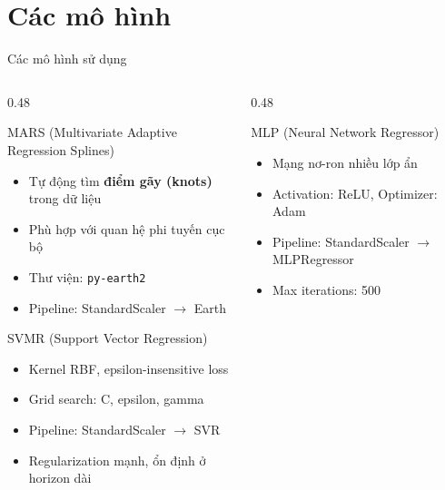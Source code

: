 \documentclass[aspectratio=169]{beamer}
\begin{document}
\section{Các mô hình}

\begin{frame}{Các mô hình sử dụng}
  \begin{columns}[T]
    \begin{column}{0.48\textwidth}
      \begin{block}{MARS (Multivariate Adaptive Regression Splines)}
        \begin{itemize}\small
          \item Tự động tìm \textbf{điểm gãy (knots)} trong dữ liệu
          \item Phù hợp với quan hệ phi tuyến cục bộ
          \item Thư viện: \texttt{py-earth2}
          \item Pipeline: StandardScaler $\to$ Earth
        \end{itemize}
      \end{block}
      \vspace{0.3em}
      \begin{block}{SVMR (Support Vector Regression)}
        \begin{itemize}\small
          \item Kernel RBF, epsilon-insensitive loss
          \item Grid search: C, epsilon, gamma
          \item Pipeline: StandardScaler $\to$ SVR
          \item Regularization mạnh, ổn định ở horizon dài
        \end{itemize}
      \end{block}
    \end{column}
    \begin{column}{0.48\textwidth}
      \begin{block}{MLP (Neural Network Regressor)}
        \begin{itemize}\small
          \item Mạng nơ-ron nhiều lớp ẩn
          \item Activation: ReLU, Optimizer: Adam
          \item Pipeline: StandardScaler $\to$ MLPRegressor
          \item Max iterations: 500
        \end{itemize}
      \end{block}

\end{column}
\end{columns}
\end{frame}
\end{document}
